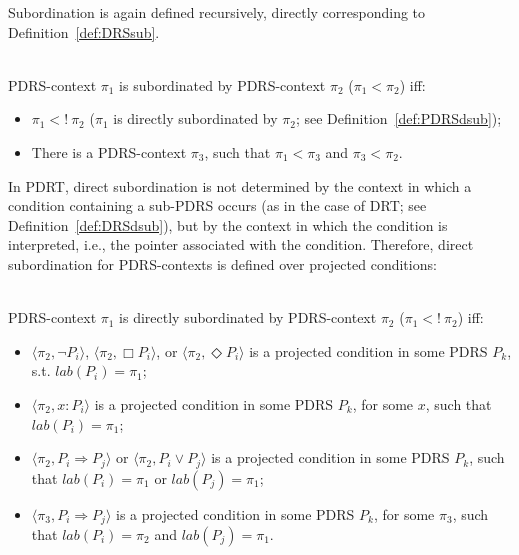 \noindent Subordination is again defined recursively, directly corresponding
to Definition~\ref{def:DRSsub}.

\begin{subdefinition}\label{def:PDRSsub}~\\
PDRS-context $\pi_1$ is subordinated by PDRS-context $\pi_2$
($\pi_1 < \pi_2$) iff:
\begin{itemize}
   \item $\pi_1 <!~\pi_2$ ($\pi_1$ is directly subordinated by $\pi_2$; 
     see Definition~\ref{def:PDRSdsub});
   \item There is a PDRS-context $\pi_3$, such that $\pi_1 < \pi_3$ and $\pi_3 < \pi_2$.
\end{itemize}
\end{subdefinition}

\noindent In PDRT, direct subordination is not determined by the context in
which a condition containing a sub-PDRS occurs (as in the case of DRT; see
Definition~\ref{def:DRSdsub}), but by the context in which the condition is
interpreted, i.e., the pointer associated with the condition. Therefore,
direct subordination for PDRS-contexts is defined over projected conditions:

\begin{subdefinition}~\label{def:PDRSdsub}\\
PDRS-context $\pi_1$ is directly subordinated by PDRS-context $\pi_2$ 
($\pi_1 <!~\pi_2$) iff:
  \begin{itemize}
    \item $\langle\pi_2,\neg P_i\rangle$,
      $\langle\pi_2,\Box P_i\rangle$,
      or $\langle\pi_2,\Diamond P_i\rangle$ is a projected condition in
      some PDRS $P_k$, s.t. $lab(P_i) = \pi_1$;
    \item $\langle\pi_2,x:P_i\rangle$ is a projected condition in some
      PDRS $P_k$, for some $x$, such that $lab(P_i) = \pi_1$;
    \item  $\langle\pi_2,P_i \Rightarrow P_j\rangle$ or
      $\langle\pi_2,P_i \vee P_j\rangle$ is a projected condition in
      some PDRS $P_k$, such that $lab(P_i) = \pi_1$ or $lab(P_j) = \pi_1$;
    \item $\langle \pi_3, P_i \Rightarrow P_j \rangle$ is a projected condition
      in some PDRS $P_k$, for some $\pi_3$, such that $lab(P_i) = \pi_2$ and 
      $lab(P_j) = \pi_1$.
  \end{itemize}
\end{subdefinition}

